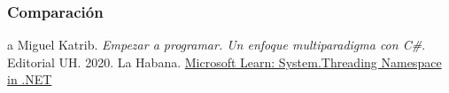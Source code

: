 \documentclass[10pt]{article} %
\begin{document}
\subsubsection{Comparaci\'on}

\begin{thebibliography}
	a
	 Miguel Katrib. \emph{Empezar a programar. Un enfoque multiparadigma con C\#}. 
	Editorial UH.
	2020.
	La Habana.
	 \href{https://learn.microsoft.com/en-us/dotnet/api/system.threading?view=net-7.0}{Microsoft Learn: System.Threading Namespace in .NET}
\end{thebibliography}
\end{document}
